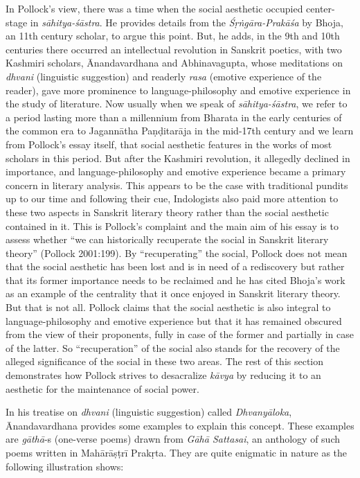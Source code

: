 In Pollock's view, there was a time when the social aesthetic occupied center-stage in {\sl sāhitya-śāstra}. He provides details from the {\sl Śṛṅgāra-Prakāśa} by Bhoja, an 11th century scholar, to argue this point. But, he adds, in the 9th and 10th centuries there occurred an intellectual revolution in Sanskrit poetics, with two Kashmiri scholars, Ānandavardhana and Abhinavagupta, whose meditations on {\sl dhvani} (linguistic suggestion) and readerly {\sl rasa} (emotive experience of the reader), gave more prominence to language-philosophy and emotive experience in the study of literature. Now usually when we speak of {\sl sāhitya-śāstra}, we refer to a period lasting more than a millennium from Bharata in the early centuries of the common era to Jagannātha Paṇḍitarāja in the mid-17th century and we learn from Pollock's essay itself, that social aesthetic features in the works of most scholars in this period. But after the Kashmiri revolution, it allegedly declined in importance, and language-philosophy and emotive experience became a primary concern in literary analysis. This appears to be the case with traditional pundits up to our time and following their cue, Indologists also paid more attention to these two aspects in Sanskrit literary theory rather than the social aesthetic contained in it. This is Pollock's complaint and the main aim of his essay is to assess whether ``we can historically recuperate the social in Sanskrit literary theory'' (Pollock 2001:199). By ``recuperating'' the social, Pollock does not mean that the social aesthetic has been lost and is in need of a rediscovery but rather that its former importance needs to be reclaimed and he has cited Bhoja's work as an example of the centrality that it once enjoyed in Sanskrit literary theory. But that is not all. Pollock claims that the social aesthetic is also integral to language-philosophy and emotive experience but that it has remained obscured from the view of their proponents, fully in case of the former and partially in case of the latter. So ``recuperation'' of the social also stands for the recovery of the alleged significance of the social in these two areas. The rest of this section demonstrates how Pollock strives to desacralize {\sl kāvya} by reducing it to an aesthetic for the maintenance of social power.

In his treatise on {\sl dhvani} (linguistic suggestion) called {\sl Dhvanyāloka}, Ānandavardhana provides some examples to explain this concept. These examples are {\sl gāthā}-s (one-verse poems) drawn from {\sl Gāhā Sattasai}, an anthology of such poems written in Mahārāṣṭrī Prakṛta. They are quite enigmatic in nature as the following illustration shows:

